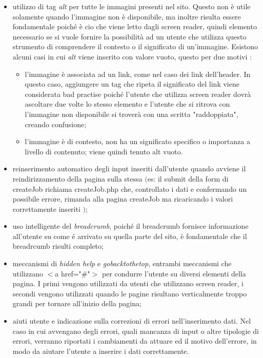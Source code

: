  \begin{itemize}
    \item utilizzo di tag \textit{alt} per tutte le immagini presenti nel sito. Questo non è utile solamente quando l'immagine non è disponibile, ma inoltre risulta essere fondamentale poiché è cio che viene letto dagli screen reader, quindi elemento necessario se si vuole fornire la possibilità ad un utente che utilizza questo strumento di comprendere il contesto o il significato di un'immagine.
        Esistono alcuni casi in cui \textit{alt} viene inserito con valore vuoto, questo per due motivi :
    \begin{itemize}
      \item l'immagine è associata ad un link, come nel caso dei link dell'header. In questo caso, aggiungere un tag che ripeta il significato del link viene considerata bad practise poiché l'utente che utilizza screen reader dovrà ascoltare due volte lo stesso elemento e l'utente che si ritrova con l'immagine non disponibile si troverà con una scritta "raddoppiata", creando confusione;
      \item l'immagine è di contesto, non ha un significato specifico o importanza a livello di contenuto; viene quindi tenuto alt vuoto.
    \end{itemize}
    \item reinserimento automatico degli input inseriti dall'utente quando avviene il reindirizzamento della pagina sulla stessa 
     $($es: il submit della form di createJob richiama createJob.php che, controllato i dati e confermando un possibile errore, rimanda alla pagina createJob ma ricaricando i valori correttamente inseriti $)$;
    \item uso intelligente del \textit{breadcrumb}, poiché il breadcrumb fornisce informazione all'utente su come é arrivato su quella parte del sito, è fondamentale che il breadrcumb risulti completo;
    \item meccanismi di \textit{hidden help} e \textit{gobacktothetop}, entrambi meccanismi che utilizzano $<$a href="\#"$>$ per condurre l'utente su diversi elementi della pagina. I primi vengono utilizzati da utenti che utilizzano screen reader, i secondi vengono utilizzati quando le pagine risultano verticalmente troppo grandi per tornare all'inizio della pagina;
    \item aiuti utente e indicazione sulla correzioni di errori nell'inserimento dati. Nel caso in cui avvengano degli errori, quali mancanza di input o altre tipologie di errori, verranno riportati i cambiamenti da attuare ed il motivo dell'errore, in modo da aiutare l'utente a inserire i dati correttamente.
  \end{itemize} 